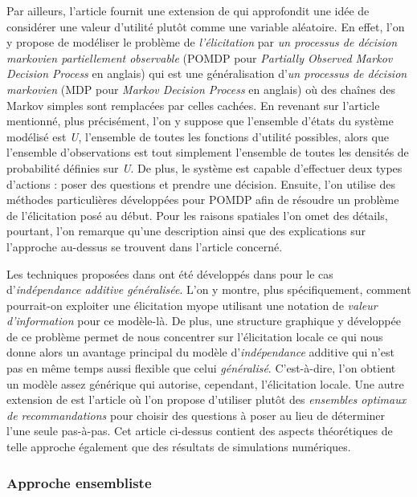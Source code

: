\documentclass[a4paper,11pt]{article}
\theoremstyle{plain}
\begin{document}
Par ailleurs, l’article \cite{boutilier_pomdp_2002}  fournit une extension de \cite{chajewska_making_2000}  qui approfondit une idée de considérer une valeur d’utilité plutôt comme une variable aléatoire. En effet, l’on y propose de modéliser le problème de \emph{l’élicitation} par \emph{un processus de décision markovien partiellement observable} (POMDP pour \emph{Partially Observed Markov Decision Process} en anglais) qui est une généralisation d'\emph{un processus de décision markovien} (MDP pour \emph{Markov Decision Process} en anglais) où des chaînes des Markov simples sont remplacées par celles cachées. En revenant sur l’article mentionné, plus précisément, l’on y suppose que l’ensemble d’états du système modélisé est \emph{U}, l’ensemble de toutes les fonctions d’utilité possibles, alors que l’ensemble d’observations est tout simplement l’ensemble de toutes les densités de probabilité définies sur \emph{U}. De plus, le système est capable d’effectuer deux types d’actions : poser des questions et prendre une décision. Ensuite, l’on utilise des méthodes particulières développées pour POMDP afin de résoudre un problème de l’élicitation posé au début. Pour les raisons spatiales l’on omet des détails, pourtant, l’on remarque qu’une description ainsi que des explications sur l’approche au-dessus se trouvent dans l’article concerné.

Les techniques proposées dans \cite{chajewska_making_2000, boutilier_pomdp_2002} ont été développés dans \cite{braziunas_local_2005} pour le cas d’\emph{indépendance additive généralisée}. L’on y montre, plus spécifiquement, comment pourrait-on exploiter une élicitation myope utilisant une notation de \emph{valeur d’information} pour ce modèle-là. De plus, une structure graphique y développée de ce problème permet de nous concentrer sur l’élicitation locale ce qui nous donne alors un avantage principal du modèle d’\emph{indépendance} additive qui n’est pas en même temps aussi flexible que celui \emph{généralisé}. C’est-à-dire, l’on obtient un modèle assez générique qui autorise, cependant, l’élicitation locale. Une autre extension de \cite{chajewska_making_2000, boutilier_pomdp_2002} est l’article \cite{viappiani_optimal_2005} où l’on propose d’utiliser plutôt des \emph{ensembles optimaux de recommandations} pour choisir des questions à poser au lieu de déterminer l’une seule pas-à-pas. Cet article ci-dessus contient des aspects théorétiques de telle approche également que des résultats de simulations numériques.

\subsubsection{Approche ensembliste}
\end{document}
